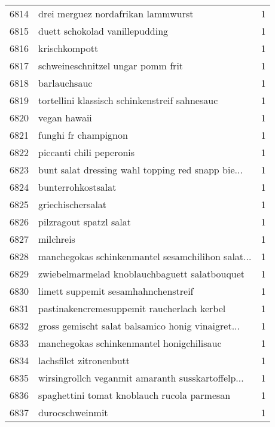 \begin{tabular}{llr}
6814 &                 drei merguez nordafrikan lammwurst &      1 \\
6815 &                     duett schokolad vanillepudding &      1 \\
6816 &                                      krischkompott &      1 \\
6817 &                  schweineschnitzel ungar pomm frit &      1 \\
6818 &                                       barlauchsauc &      1 \\
6819 &      tortellini klassisch schinkenstreif sahnesauc &      1 \\
6820 &                                       vegan hawaii &      1 \\
6821 &                               funghi fr champignon &      1 \\
6822 &                           piccanti chili peperonis &      1 \\
6823 &  bunt salat dressing wahl topping red snapp bie... &      1 \\
6824 &                                 bunterrohkostsalat &      1 \\
6825 &                                  griechischersalat &      1 \\
6826 &                            pilzragout spatzl salat &      1 \\
6827 &                                          milchreis &      1 \\
6828 &  manchegokas schinkenmantel sesamchilihon salat... &      1 \\
6829 &      zwiebelmarmelad knoblauchbaguett salatbouquet &      1 \\
6830 &                limett suppemit sesamhahnchenstreif &      1 \\
6831 &         pastinakencremesuppemit raucherlach kerbel &      1 \\
6832 &  gross gemischt salat balsamico honig vinaigret... &      1 \\
6833 &          manchegokas schinkenmantel honigchilisauc &      1 \\
6834 &                            lachsfilet zitronenbutt &      1 \\
6835 &  wirsingrollch veganmit amaranth susskartoffelp... &      1 \\
6836 &        spaghettini tomat knoblauch rucola parmesan &      1 \\
6837 &                                    durocschweinmit &      1 \\

\end{tabular}
